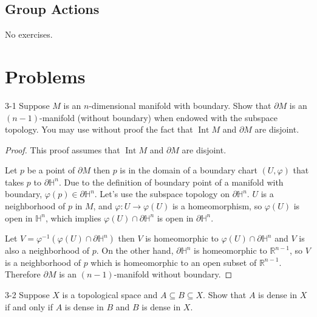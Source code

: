 \subsection*{Group Actions}

No exercises.

\section*{Problems}

\begin{problem}{3-1}
Suppose $M$ is an $n$-dimensional manifold with boundary. Show that $\partial M$ is an $(n-1)$-manifold (without boundary) when endowed with the subspace topology. You may use without proof the fact that $\operatorname{Int}M$ and $\partial M$ are disjoint.
\end{problem}

\begin{proof}
	This proof assumes that $\operatorname{Int}M$ and $\partial M$ are disjoint.

	Let $p$ be a point of $\partial M$ then $p$ is in the domain of a boundary chart $(U, \varphi)$ that takes $p$ to $\partial\mathbb{H}^{n}$. Due to the definition of boundary point of a manifold with boundary, $\varphi(p) \in \partial\mathbb{H}^{n}$. Let's use the subspace topology on $\partial\mathbb{H}^{n}$. $U$ is a neighborhood of $p$ in $M$, and $\varphi: U \to \varphi(U)$ is a homeomorphism, so $\varphi(U)$ is open in $\mathbb{H}^{n}$, which implies $\varphi(U) \cap \partial\mathbb{H}^{n}$ is open in $\partial\mathbb{H}^{n}$.

	Let $V = \varphi^{-1}(\varphi(U) \cap \partial\mathbb{H}^{n})$ then $V$ is homeomorphic to $\varphi(U) \cap \partial\mathbb{H}^{n}$ and $V$ is also a neighborhood of $p$. On the other hand, $\partial\mathbb{H}^{n}$ is homeomorphic to $\mathbb{R}^{n-1}$, so $V$ is a neighborhood of $p$ which is homeomorphic to an open subset of $\mathbb{R}^{n-1}$. Therefore $\partial M$ is an $(n-1)$-manifold without boundary.
\end{proof}

\begin{problem}{3-2}
Suppose $X$ is a topological space and $A\subseteq B\subseteq X$. Show that $A$ is dense in $X$ if and only if $A$ is dense in $B$ and $B$ is dense in $X$.
\end{problem}

